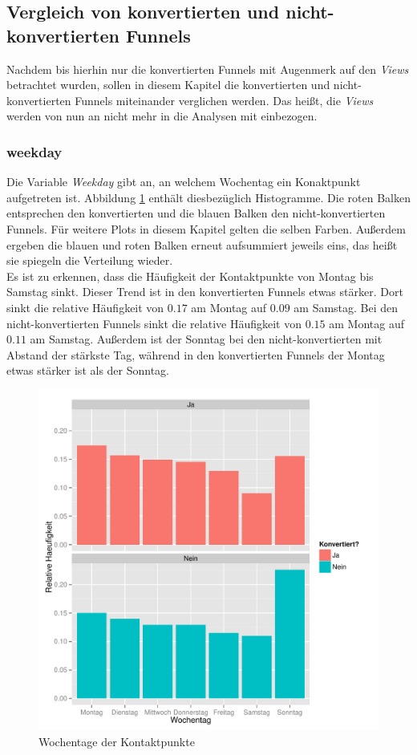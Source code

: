\subsection{Vergleich von konvertierten und nicht-konvertierten Funnels}

Nachdem bis hierhin nur die konvertierten Funnels mit Augenmerk auf den \textit{Views} betrachtet wurden, sollen in diesem Kapitel die konvertierten und nicht-konvertierten Funnels miteinander verglichen werden. Das heißt, die \textit{Views} werden von nun an nicht mehr in die Analysen mit einbezogen.

\subsubsection*{weekday}
Die Variable \textit{Weekday} gibt an, an welchem Wochentag ein Konaktpunkt aufgetreten ist. Abbildung \ref{weekday} enthält diesbezüglich Histogramme. Die roten Balken entsprechen den konvertierten und die blauen Balken den nicht-konvertierten Funnels. Für weitere Plots in diesem Kapitel gelten die selben Farben. Außerdem ergeben die blauen und roten Balken erneut aufsummiert jeweils eins, das heißt sie spiegeln die Verteilung wieder.\\
Es ist zu erkennen, dass die Häufigkeit der Kontaktpunkte von Montag bis Samstag sinkt. Dieser Trend ist in den konvertierten Funnels etwas stärker. Dort sinkt die relative Häufigkeit von $ 0.17 $ am Montag auf $ 0.09 $ am Samstag. Bei den nicht-konvertierten Funnels sinkt die relative Häufigkeit von $ 0.15 $ am Montag auf $ 0.11 $ am Samstag. Außerdem ist der Sonntag bei den nicht-konvertierten mit Abstand der stärkste Tag, während in den konvertierten Funnels der Montag etwas stärker ist als der Sonntag.

\begin{figure}[H]
    \centering
    \includegraphics[scale=0.5]{weekday.pdf}
    \caption{Wochentage der Kontaktpunkte}
    \label{weekday}
\end{figure}

